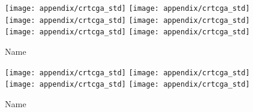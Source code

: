 \begin{appendices}
	\begin{figure}[htpb]
		\ContinuedFloat
		\captionsetup{list=off,format=cont}
		\centering
		\texttt{[image: appendix/crtcga\_std]}
		\hfill
		\texttt{[image: appendix/crtcga\_std]}\\
		\texttt{[image: appendix/crtcga\_std]}
		\hfill
		\texttt{[image: appendix/crtcga\_std]}\\
		\texttt{[image: appendix/crtcga\_std]}
		\hfill
		\texttt{[image: appendix/crtcga\_std]}\\
		\caption{Name}
	\end{figure}

	\begin{figure}[htpb]
		\ContinuedFloat
		\captionsetup{list=off,format=cont}
		\centering
		\texttt{[image: appendix/crtcga\_std]}
		\hfill
		\texttt{[image: appendix/crtcga\_std]}\\
		\texttt{[image: appendix/crtcga\_std]}
		\hfill
		\texttt{[image: appendix/crtcga\_std]}\\
		\caption{Name}
	\end{figure}


\end{appendices}
